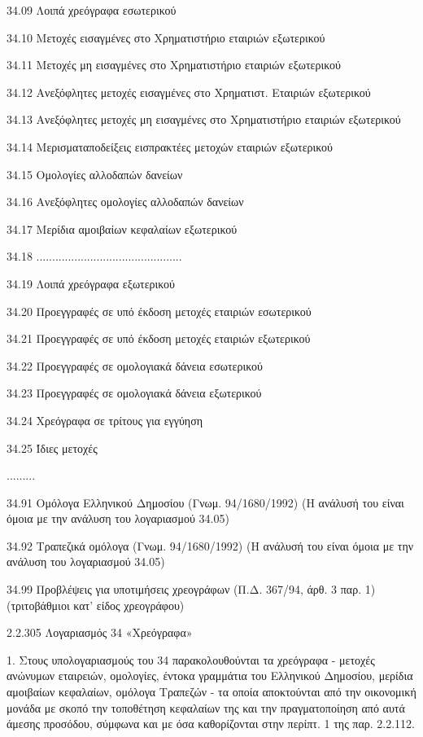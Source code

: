 \documentclass[A4,10pt,greek]{book}
\begin{document}
        34.09   Λοιπά χρεόγραφα εσωτερικού

        34.10   Μετοχές εισαγμένες στο Χρηματιστήριο εταιριών εξωτερικού

        34.11   Μετοχές μη εισαγμένες στο Χρηματιστήριο εταιριών εξωτερικού

        34.12   Ανεξόφλητες μετοχές εισαγμένες στο Χρηματιστ. Εταιριών
                    εξωτερικού

        34.13   Ανεξόφλητες μετοχές μη εισαγμένες στο Χρηματιστήριο εταιριών
                    εξωτερικού

        34.14   Μερισματαποδείξεις εισπρακτέες μετοχών εταιριών εξωτερικού

        34.15   Ομολογίες αλλοδαπών δανείων

        34.16   Ανεξόφλητες ομολογίες αλλοδαπών δανείων

        34.17   Μερίδια αμοιβαίων κεφαλαίων εξωτερικού

        34.18   ..............................................

        34.19   Λοιπά χρεόγραφα εξωτερικού

        34.20   Προεγγραφές σε υπό έκδοση μετοχές εταιριών εσωτερικού

        34.21   Προεγγραφές σε υπό έκδοση μετοχές εταιριών εξωτερικού

        34.22   Προεγγραφές σε ομολογιακά δάνεια εσωτερικού

        34.23   Προεγγραφές σε ομολογιακά δάνεια εξωτερικού

        34.24   Χρεόγραφα σε τρίτους για εγγύηση

        34.25   Ίδιες μετοχές

        .........

        34.91   Ομόλογα Ελληνικού Δημοσίου (Γνωμ. 94/1680/1992)
                    (Η ανάλυσή του είναι όμοια με την ανάλυση του λογαριασμού 34.05)

        34.92    Τραπεζικά ομόλογα (Γνωμ. 94/1680/1992)
                      (Η ανάλυσή του είναι όμοια με την ανάλυση του λογαριασμού 34.05)

        34.99   Προβλέψεις για υποτιμήσεις χρεογράφων (Π.Δ. 367/94, άρθ. 3 παρ. 1)
                     (τριτοβάθμιοι κατ' είδος χρεογράφου)

2.2.305 Λογαριασμός 34 «Χρεόγραφα»

1. Στους υπολογαριασμούς του 34 παρακολουθούνται τα χρεόγραφα - μετοχές ανώνυμων εταιρειών, ομολογίες, έντοκα γραμμάτια του Ελληνικού Δημοσίου, μερίδια αμοιβαίων κεφαλαίων, ομόλογα Τραπεζών - τα οποία αποκτούνται από την οικονομική μονάδα με σκοπό την τοποθέτηση κεφαλαίων της και την πραγματοποίηση από αυτά άμεσης προσόδου, σύμφωνα και με όσα καθορίζονται στην περίπτ. 1 της παρ.  2.2.112.
\end{document}
